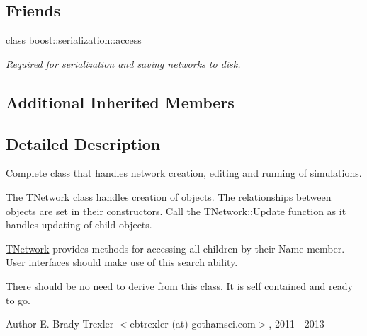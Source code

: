 \subsection*{Friends}
\begin{DoxyCompactItemize}
\item 
\hypertarget{class_t_network_ac98d07dd8f7b70e16ccb9a01abf56b9c}{class \hyperlink{class_t_network_ac98d07dd8f7b70e16ccb9a01abf56b9c}{boost\+::serialization\+::access}}\label{class_t_network_ac98d07dd8f7b70e16ccb9a01abf56b9c}

\begin{DoxyCompactList}\small\item\em Required for serialization and saving networks to disk. \end{DoxyCompactList}\end{DoxyCompactItemize}
\subsection*{Additional Inherited Members}


\subsection{Detailed Description}
Complete class that handles network creation, editing and running of simulations. 

The \hyperlink{class_t_network}{T\+Network} class handles creation of objects. The relationships between objects are set in their constructors. Call the \hyperlink{class_t_network_aa9ec65dcbbdad1ad67eaef33838a49c7}{T\+Network\+::\+Update} function as it handles updating of child objects.

\hyperlink{class_t_network}{T\+Network} provides methods for accessing all children by their Name member. User interfaces should make use of this search ability.

There should be no need to derive from this class. It is self contained and ready to go.

\begin{DoxyAuthor}{Author}
E. Brady Trexler $<$ebtrexler (at) gothamsci.\+com$>$, 2011 -\/ 2013 
\end{DoxyAuthor}


